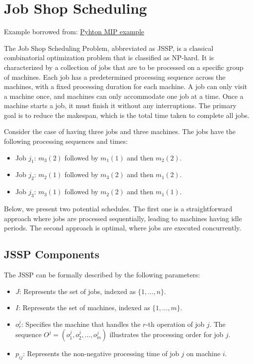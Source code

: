 {\newpage





\section{Job Shop Scheduling}
\todoSection{}
Example borrowed from: \href{https://python-mip.readthedocs.io/en/latest/examples.html#job-shop-scheduling-problem}{Pyhton MIP example}

The Job Shop Scheduling Problem, abbreviated as JSSP, is a classical combinatorial optimization problem that is classified as NP-hard. It is characterized by a collection of jobs that are to be processed on a specific group of machines. Each job has a predetermined processing sequence across the machines, with a fixed processing duration for each machine. A job can only visit a machine once, and machines can only accommodate one job at a time. Once a machine starts a job, it must finish it without any interruptions. The primary goal is to reduce the makespan, which is the total time taken to complete all jobs.

Consider the case of having three jobs and three machines. The jobs have the following processing sequences and times:

\begin{itemize}
  \item Job \( j_1 \): \( m_3(2) \) followed by \( m_1(1) \) and then \( m_2(2) \).
  \item Job \( j_2 \): \( m_2(1) \) followed by \( m_3(2) \) and then \( m_1(2) \).
  \item Job \( j_3 \): \( m_3(1) \) followed by \( m_2(2) \) and then \( m_1(1) \).
\end{itemize}

Below, we present two potential schedules. The first one is a straightforward approach where jobs are processed sequentially, leading to machines having idle periods. The second approach is optimal, where jobs are executed concurrently.

\subsection{JSSP Components}
The JSSP can be formally described by the following parameters:

\begin{itemize}
  \item \( J\): Represents the set of jobs, indexed as \( \{1, \ldots, n\} \).
  \item \( I\): Represents the set of machines, indexed as \( \{1, \ldots, m\} \).
  \item \( o_r^j \): Specifies the machine that handles the \( r \)-th operation of job \( j \). The sequence \( O^j=\left(o_1^j, o_2^j, \ldots, o_m^j\right) \) illustrates the processing order for job \( j \).
  \item \( p_{i j} \): Represents the non-negative processing time of job \( j \) on machine \( i \).
\end{itemize}

}
